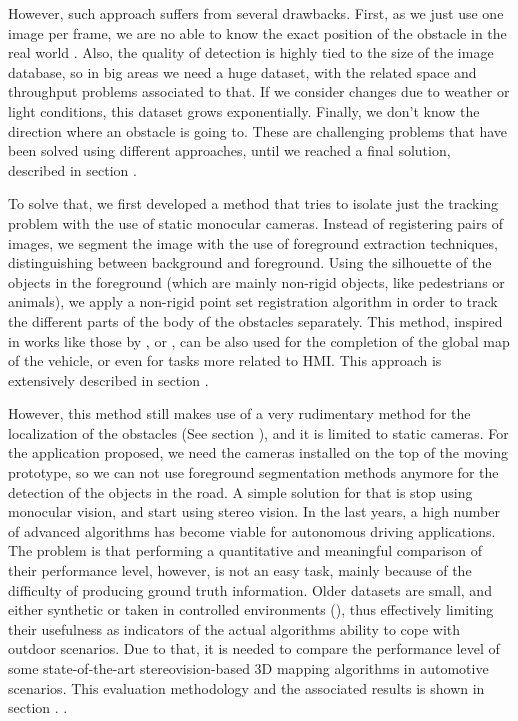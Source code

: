 However, such approach suffers from several drawbacks. First, as we just use one image per frame, we are no able to know the exact position of the obstacle in the real world . Also, the quality of detection is highly tied to the size of the image database, so in big areas we need a huge dataset, with the related space and throughput problems associated to that. If we consider changes due to weather or light conditions, this dataset grows exponentially. Finally, we don't know the direction where an obstacle is going to. These are challenging problems that have been solved using different approaches, until we reached a final solution, described in section \todo { \ref{XXX} }.

To solve that, we first developed a method that tries to isolate just the tracking problem with the use of static monocular cameras. Instead of registering pairs of images, we segment the image with the use of foreground extraction techniques, distinguishing between background and foreground. Using the silhouette of the objects in the foreground (which are mainly non-rigid objects, like pedestrians or animals), we apply a non-rigid point set registration algorithm in order to track the different parts of the body of the obstacles separately. This method, inspired in works like those by \cite{starck2007surface}, or \cite{letouzey2011scene}, can be also used for the completion of the global map of the vehicle, or even for tasks more related to \ac{HMI}. This approach is extensively described in section \todo{ \ref{XXX}}.

However, this method still makes use of a very rudimentary method for the localization of the obstacles (See section \todo{ \ref{XXX-subsection_localization}}), and it is limited to static cameras. For the application proposed, we need the cameras installed on the top of the moving prototype, so we can not use foreground segmentation methods anymore for the detection of the objects in the road. A simple solution for that is stop using monocular vision, and start using stereo vision. In the last years, a high number of advanced algorithms has become viable for autonomous driving applications. The problem is that performing a quantitative and meaningful comparison of their performance level, however, is not an easy task, mainly because of the difficulty of producing ground truth information. Older datasets are small, and either synthetic or taken in controlled environments (\cite{Scharstein2002}), thus effectively limiting their usefulness as indicators of the actual algorithms ability to cope with outdoor scenarios. Due to that, it is needed to compare the performance level of some state-of-the-art stereovision-based 3D mapping algorithms in automotive scenarios. This evaluation methodology and the associated results is shown in section \todo{ \ref{XXX}}. .

